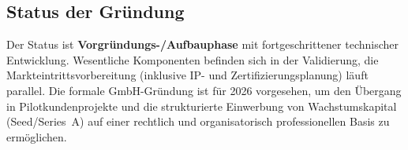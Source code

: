 \documentclass[11pt,a4paper]{article}
\begin{document}
\subsection{Status der Gründung}
Der Status ist \textbf{Vorgründungs-/Aufbauphase} mit fortgeschrittener technischer Entwicklung. Wesentliche Komponenten befinden sich in der Validierung, die Markteintrittsvorbereitung (inklusive IP- und Zertifizierungsplanung) läuft parallel. Die formale GmbH-Gründung ist für 2026 vorgesehen, um den Übergang in Pilotkundenprojekte und die strukturierte Einwerbung von Wachstumskapital (Seed/Series~A) auf einer rechtlich und organisatorisch professionellen Basis zu ermöglichen.







\end{document}
